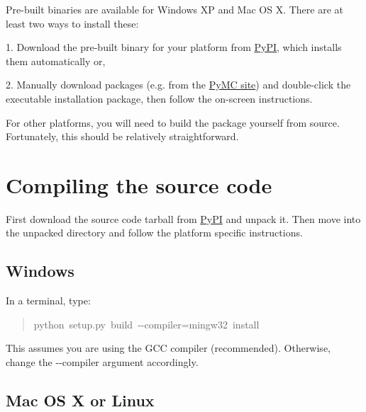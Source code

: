 Pre-built binaries are available for Windows XP and Mac OS X. There are at least
two ways to install these:

1. Download the pre-built binary for your platform from \href{http://pypi.python.org/pypi/pymc/}{PyPI}, which installs them
automatically or,

2. Manually download packages (e.g. from the \href{pymc.googlecode.com}{PyMC site}) and double-click 
the executable installation package, then follow the on-screen instructions.

For other platforms, you will need to build the package yourself from source. 
Fortunately, this should be relatively straightforward.



\hypertarget{compiling-the-source-code}{}
\section*{Compiling the source code}

First download the source code tarball from \href{http://pypi.python.org/pypi/pymc/}{PyPI} and unpack it. Then move 
into the unpacked directory and follow the platform specific instructions.



\hypertarget{windows}{}
\subsection*{Windows}

In a terminal, type:
\begin{quote}{\ttfamily \raggedright \noindent
python~setup.py~build~-{}-compiler=mingw32~install
}\end{quote}

This assumes you are using the GCC compiler (recommended). Otherwise, 
change the -{}-compiler argument accordingly.



\hypertarget{mac-os-x-or-linux}{}
\subsection*{Mac OS X or Linux}

